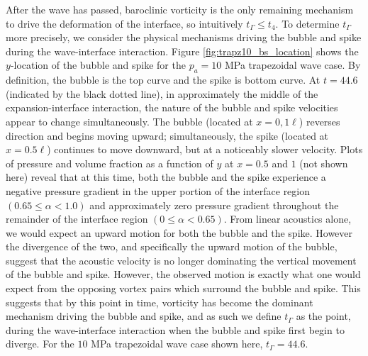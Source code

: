 \documentclass{jfm}%
\begin{document}
After the wave has passed, baroclinic vorticity is the only remaining
mechanism to drive the deformation of the interface, so intuitively
$t_\Gamma \leq t_4$. To determine $t_\Gamma$ more precisely, we
consider the physical mechanisms driving the bubble and spike during
the wave-interface interaction. Figure \ref{fig:trapz10_bs_location}
shows the $y$-location of the bubble and spike for the $p_a = 10$ MPa
trapezoidal wave case. By definition, the bubble is the top curve and
the spike is bottom curve. At $t = 44.6$ (indicated by the black
dotted line), in approximately the middle of the expansion-interface
interaction, the nature of the bubble and spike velocities appear to
change simultaneously. The bubble (located at $x = 0, 1\ell$) reverses
direction and begins moving upward; simultaneously, the spike (located
at $x = 0.5\ell$) continues to move downward, but at a noticeably
slower velocity. Plots of pressure and volume fraction as a function
of $y$ at $x=0.5$ and $1$ (not shown here) reveal that at this time,
both the bubble and the spike experience a negative pressure gradient
in the upper portion of the interface region
$(0.65 \leq \alpha < 1.0)$ and approximately zero pressure gradient
throughout the remainder of the interface region
$(0 \leq \alpha < 0.65)$. From linear acoustics alone, we would expect
an upward motion for both the bubble and the spike. However the
divergence of the two, and specifically the upward motion of the
bubble, suggest that the acoustic velocity is no longer dominating the
vertical movement of the bubble and spike. However, the observed
motion is exactly what one would expect from the opposing vortex
pairs which surround the bubble and spike. This suggests that by this
point in time, vorticity has become the dominant mechanism driving the
bubble and spike, and as such we define $t_\Gamma$ as the point,
during the wave-interface interaction when the bubble and spike first
begin to diverge. For the $10$ MPa trapezoidal wave case shown here,
$t_\Gamma=44.6$.
%
%
\end{document}
